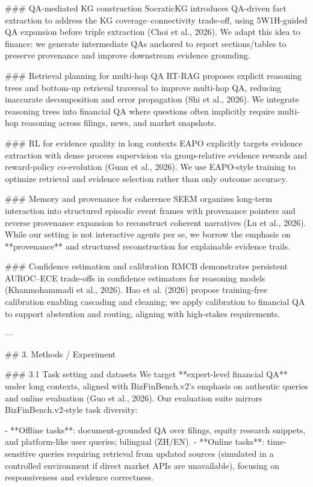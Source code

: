 ### QA-mediated KG construction  
SocraticKG introduces QA-driven fact extraction to address the KG coverage–connectivity trade-off, using 5W1H-guided QA expansion before triple extraction (Choi et al., 2026). We adapt this idea to finance: we generate intermediate QAs anchored to report sections/tables to preserve provenance and improve downstream evidence grounding.

### Retrieval planning for multi-hop QA  
RT-RAG proposes explicit reasoning trees and bottom-up retrieval traversal to improve multi-hop QA, reducing inaccurate decomposition and error propagation (Shi et al., 2026). We integrate reasoning trees into financial QA where questions often implicitly require multi-hop reasoning across filings, news, and market snapshots.

### RL for evidence quality in long contexts  
EAPO explicitly targets evidence extraction with dense process supervision via group-relative evidence rewards and reward-policy co-evolution (Guan et al., 2026). We use EAPO-style training to optimize retrieval and evidence selection rather than only outcome accuracy.

### Memory and provenance for coherence  
SEEM organizes long-term interaction into structured episodic event frames with provenance pointers and reverse provenance expansion to reconstruct coherent narratives (Lu et al., 2026). While our setting is not interactive agents per se, we borrow the emphasis on **provenance** and structured reconstruction for explainable evidence trails.

### Confidence estimation and calibration  
RMCB demonstrates persistent AUROC–ECE trade-offs in confidence estimators for reasoning models (Khanmohammadi et al., 2026). Hao et al. (2026) propose training-free calibration enabling cascading and cleaning; we apply calibration to financial QA to support abstention and routing, aligning with high-stakes requirements.

---

## 3. Methods / Experiment  

### 3.1 Task setting and datasets  
We target **expert-level financial QA** under long contexts, aligned with BizFinBench.v2’s emphasis on authentic queries and online evaluation (Guo et al., 2026). Our evaluation suite mirrors BizFinBench.v2-style task diversity:

- **Offline tasks**: document-grounded QA over filings, equity research snippets, and platform-like user queries; bilingual (ZH/EN).  
- **Online tasks**: time-sensitive queries requiring retrieval from updated sources (simulated in a controlled environment if direct market APIs are unavailable), focusing on responsiveness and evidence correctness.

